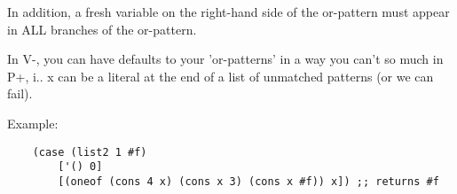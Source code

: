 \documentclass[]{article}
\begin{document}
In addition, a fresh variable on the right-hand side of the or-pattern must
appear in ALL branches of the or-pattern. 

In V-, you can have defaults to your 'or-patterns' in a way you can't so much in
P+, i.\expr. x can be a literal at the end of a list of unmatched patterns (or we
can fail).

Example: 
\begin{verbatim}
    (case (list2 1 #f)
        ['() 0]
        [(oneof (cons 4 x) (cons x 3) (cons x #f)) x]) ;; returns #f
\end{verbatim}







\end{document}
